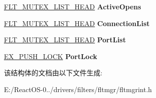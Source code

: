 \begin{DoxyCompactItemize}
\hyperlink{struct___f_l_t___m_u_t_e_x___l_i_s_t___h_e_a_d}{F\+L\+T\+\_\+\+M\+U\+T\+E\+X\+\_\+\+L\+I\+S\+T\+\_\+\+H\+E\+AD} {\bfseries Active\+Opens}
\item 
\mbox{\label{struct___f_l_t___f_i_l_t_e_r_a3e9a1bbf52d1a96c351196b70287faed}} 
\hyperlink{struct___f_l_t___m_u_t_e_x___l_i_s_t___h_e_a_d}{F\+L\+T\+\_\+\+M\+U\+T\+E\+X\+\_\+\+L\+I\+S\+T\+\_\+\+H\+E\+AD} {\bfseries Connection\+List}
\item 
\mbox{\label{struct___f_l_t___f_i_l_t_e_r_a1f57259847838c75a35fbab3f4ba8c7b}} 
\hyperlink{struct___f_l_t___m_u_t_e_x___l_i_s_t___h_e_a_d}{F\+L\+T\+\_\+\+M\+U\+T\+E\+X\+\_\+\+L\+I\+S\+T\+\_\+\+H\+E\+AD} {\bfseries Port\+List}
\item 
\mbox{\label{struct___f_l_t___f_i_l_t_e_r_a3e758a457b3fa9b6c608ea18f84d980d}} 
\hyperlink{struct___e_x___p_u_s_h___l_o_c_k}{E\+X\+\_\+\+P\+U\+S\+H\+\_\+\+L\+O\+CK} {\bfseries Port\+Lock}
\end{DoxyCompactItemize}


该结构体的文档由以下文件生成\+:\begin{DoxyCompactItemize}
\item 
E\+:/\+React\+O\+S-\/0../drivers/filters/fltmgr/fltmgrint.\+h\end{DoxyCompactItemize}
